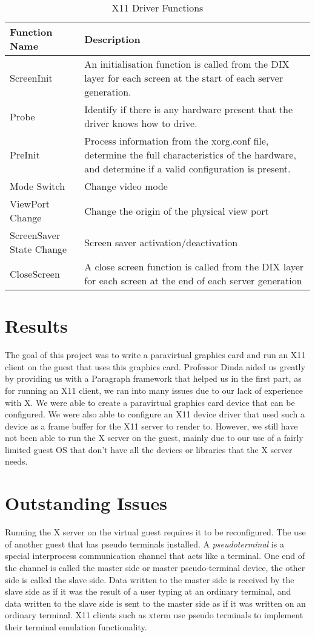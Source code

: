 \documentclass{acm_proc_article-sp}
\begin{document}
\begin{table}
 \centering
  \caption{X11 Driver Functions}
  \begin{tabular}{|l|p{4cm}|} \hline
  \textbf{Function Name}&\textbf{Description}\\ \hline
  ScreenInit & An initialisation function is called from the DIX layer for each screen at the start of each server generation.\\ \hline
  Probe & Identify if there is any hardware present that the driver knows how to drive.\\ \hline
  PreInit & Process information from the xorg.conf file, determine the full characteristics of the hardware, and determine if a valid configuration is present. \\ \hline
  Mode Switch & Change video mode \\ \hline
  ViewPort Change & Change the origin of the physical view port \\ \hline
  ScreenSaver State Change & Screen saver activation/deactivation \\ \hline
  CloseScreen & A close screen function is called from the DIX layer for each screen at the end of each server generation \\ \hline
\end{tabular}
\end{table}


\section{Results}
The goal of this project was to write a paravirtual graphics card and run an X11
client on the guest that uses this graphics card. Professor Dinda aided us
greatly by providing us with a Paragraph framework that helped us in the first
part, as for running an X11 client, we ran into many issues due to our lack of
experience with X. We were able to create a paravirtual graphics card device
that can be configured. 
We were also able to configure an X11 device driver that used such a device as a
frame buffer for the X11 server to render to. However, we still have not been able to run
the X server on the guest, mainly due to our use of a fairly limited guest OS
that don't have all the devices or libraries that the X server needs.

\section{Outstanding Issues}
Running the X server on the virtual guest requires it to be reconfigured. The
use of another guest that has pseudo terminals installed. A
\textit{pseudo\textunderscore terminal} is a special interprocess communication
channel that acts like a terminal. One end of the channel is called the master side or master pseudo-terminal device, 
the other side is called the slave side. 
Data written to the master side is received by the slave side as if it was the result of a user typing at an ordinary terminal, 
and data written to the slave side is sent to the master side as if it was written on an ordinary terminal.
X11 clients such as xterm use pseudo terminals to implement their terminal emulation functionality.
\end{document}
